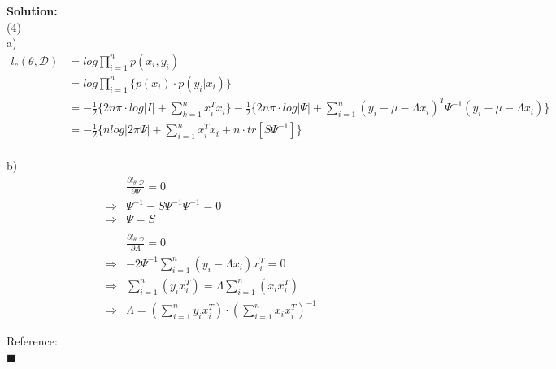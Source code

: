 \documentclass{article}
\newenvironment{solution}                               %
{\textbf{Solution:} \\}{$\blacksquare$\newline}         %
\newcommand{\leadto}{\Rightarrow}                       %
\begin{document}
\begin{solution}
        (4) \\
        a)
        \begin{align*}
            l_c(\theta, \mathcal{D}) &= log \prod_{i=1}^{n}{p(x_i, y_i)} \\
            &= log \prod_{i=1}^{n} \{p(x_i) \cdot p(y_i|x_i)\} \\
            &= -\frac{1}{2}\{2n\pi \cdot log|I| + \sum_{k=1}^{n} x_i^T x_i\}
               -\frac{1}{2}\{2n\pi \cdot log|\Psi| + \sum_{i=1}^{n}(y_i-\mu-\Lambda x_i)^T \Psi^{-1} (y_i-\mu-\Lambda x_i)\} \\
            &= -\frac{1}{2}\{n log|2 \pi \Psi| + \sum_{i=1}^{n}{x_i^T x_i} + n \cdot tr[S \Psi^{-1}]\}
        \end{align*} \\
        b) \\
        \begin{align*}
            & \frac{\partial l_{\theta, \mathcal{D}}}{\partial \Psi} = 0 \\
            \leadto &
                \Psi^{-1} - S \Psi^{-1} \Psi^{-1} = 0 \\
            \leadto &
                \Psi = S
            \\
            \\
            & \frac{\partial l_{\theta, \mathcal{D}}}{\partial \Lambda} = 0 \\
            \leadto &
                -2 \Psi^{-1} \sum_{i=1}^{n}{(y_i - \Lambda x_i)x_i^T} = 0 \\
            \leadto &
                \sum_{i=1}^{n}(y_i x_i^T) = \Lambda \sum_{i=1}^{n}(x_i x_i^T) \\
            \leadto &
                \Lambda = (\sum_{i=1}^{n}y_i x_i^T) \cdot (\sum_{i=1}^{n}x_i x_i^T)^{-1}
        \end{align*}      

        Reference:\\
    \end{solution}
\end{document}
